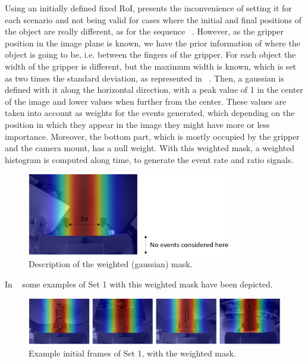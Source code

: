Using an initially defined fixed RoI, presents the inconvenience of setting it for each scenario and not being valid for cases where the initial and final positions of the object are really different, as for the sequence ~. However, as the gripper position in the image plane is known, we have the prior information of where the object is going to be, i.e. between the fingers of the gripper. For each object the width of the gripper is different, but the maximum width is known, which is set as two times the standard deviation, as represented in ~. Then, a gaussian is defined with it along the horizontal direction, with a peak value of 1 in the center of the image and lower values when further from the center. These values are taken into account as weights for the events generated, which depending on the position in which they appear in the image they might have more or less importance. Moreover, the bottom part, which is mostly occupied by the gripper and the camera mount, has a null weight. With this weighted mask, a weighted histogram is computed along time, to generate the event rate and ratio signals.

\begin{figure}[h]
    \centering
    \includegraphics[width=0.8\textwidth]{resources/images/gaus_mask}
    \caption{Description of the weighted (gaussian) mask.}\label{fig:gaus_mask}
\end{figure}

In ~ some examples of Set 1 with this weighted mask have been depicted.

\begin{figure}[h]
    \centering
    \includegraphics[width=\textwidth]{resources/images/fix_mask}
    \caption{Example initial frames of Set 1, with the weighted mask.}\label{fig:fix_mask}
\end{figure}

